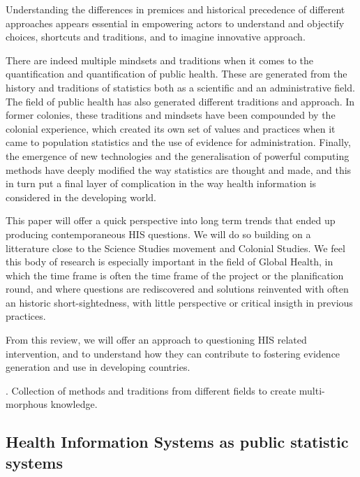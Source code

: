 Understanding the differences in premices and historical precedence of different approaches appears essential in empowering actors to understand and objectify choices, shortcuts and traditions, and to imagine innovative approach.

There are indeed multiple mindsets and traditions when it comes to the quantification and quantification of public health. These are generated from the history and traditions of statistics both as a scientific and an administrative field. The field of public health has also generated different traditions and approach. In former colonies, these traditions and mindsets have been compounded by the colonial experience, which created its own set of values and practices when it came to population statistics and the use of evidence for administration. Finally, the emergence of new technologies and the generalisation of powerful computing methods have deeply modified the way statistics are thought and made, and this in turn put a final layer of complication in the way health information is considered in the developing world.

This paper will offer a quick perspective into long term trends that ended up producing contemporaneous HIS questions. We will do so building on a litterature close to the Science Studies movement and Colonial Studies. We feel this body of research is especially important in the field of Global Health, in which the time frame is often the time frame of the project or the planification round, and where questions are rediscovered and solutions reinvented with often an historic short-sightedness, with little perspective or critical insigth in previous practices.

From this review, we will offer an approach to questioning HIS related intervention, and to understand how they can contribute to fostering evidence generation and use in developing countries.

\cite{vital_wave_consulting_health_2009}. Collection of methods and traditions from different fields to create multi-morphous knowledge. %








\subsection{Health Information Systems as public statistic systems}

